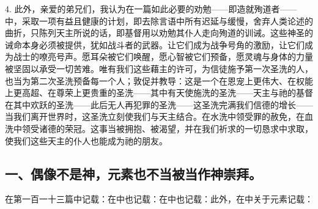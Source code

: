 \newline{}4. 此外，亲爱的弟兄们，我认为在一篇如此必要的劝勉——即造就殉道者——中，采取一项有益且健康的计划，即去除言语中所有迟延与缓慢，舍弃人类论述的曲折，只陈列天主所说的话，即基督用以劝勉其仆人走向殉道的训诫。这些神圣的诫命本身必须被提供，犹如战斗者的武器。让它们成为战争号角的激励，让它们成为战士的嘹亮号声。愿耳朵被它们唤醒，愿心智被它们预备，愿灵魂与身体的力量被坚固以承受一切苦难。唯有我们这些藉主的许可，为信徒施予第一次圣洗的人，也当为第二次圣洗预备每一个人；敦促并教导：这是一个在恩宠上更伟大、在权能上更高超、在尊荣上更贵重的圣洗——其中有天使施洗的圣洗——天主与祂的基督在其中欢跃的圣洗——此后无人再犯罪的圣洗——这圣洗完满我们信德的增长——当我们离开世界时，这圣洗立刻使我们与天主结合。在水洗中领受罪的赦免，在血洗中领受诸德的荣冠。这事当被拥抱、被渴望，并在我们祈求的一切恳求中求取，使我们这些天主的仆人也能成为祂的朋友。\par


\subsection{一、偶像不是神，元素也不当被当作神崇拜。}

在第一百一十三篇中记载：\newline{}在中也记载：\newline{}在中也记载：\newline{}此外，在中关于元素记载：\par


